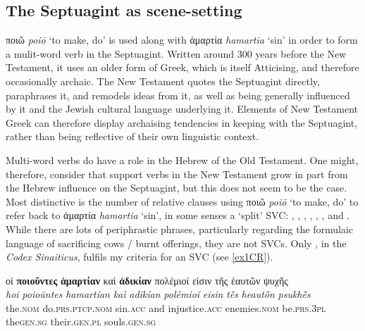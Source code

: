 \documentclass[output=paper,colorlinks,citecolor=brown]{langscibook}
\begin{document}
\subsection{The Septuagint as scene-setting}\label{the-septuagint-as-scene-settingCR}

ποιῶ \textit{poiō} ‘to make, do' is used along with ἁμαρτία \textit{hamartia} ‘sin' in order to form a mulit-word verb in the
Septuagint. 
Written around 300 years before the New Testament, it uses
an older form of Greek, which is itself Atticising, and therefore
occasionally archaic. 
The New Testament quotes the Septuagint directly,
paraphrases it, and remodels ideas from it, as well as being generally
influenced by it and the Jewish cultural language underlying it.
Elements of New Testament Greek can therefore display archaising
tendencies in keeping with the Septuagint, rather than being reflective of
their own linguistic context.

Multi-word verbs do have a role in the Hebrew of the Old Testament. 
One
might, therefore, consider that support verbs in the New Testament grow
in part from the Hebrew influence on the Septuagint, but this does not
seem to be the case. 
Most distinctive is the number of relative clauses
using ποιῶ \textit{poiō} ‘to make, do' to refer back to ἁμαρτία \textit{hamartia} ‘sin', in some senses a `split' SVC:
, , , , , , and . While there are lots of
periphrastic phrases, particularly regarding the formulaic language of
sacrificing cows / burnt offerings, they are not SVCs. Only , in the \textit{Codex Sinaiticus}, fulfils my criteria for an
SVC (see \ref{ex1CR}).


\ea\label{ex1CR}
\glll οἱ \textbf{ποιοῦντες} \textbf{ἁμαρτίαν} καὶ \textbf{ἀδικίαν} πολέμιοί εἰσιν τῆς ἑαυτῶν ψυχῆς \\
\textit{hoi}   \textit{poioũntes}  \textit{hamartían}  \textit{kaì}            \textit{adikían}    \textit{polémioí}   \textit{eisin}      \textit{tē̃s}        \textit{heautō̃n}   \textit{psukhē̃s}\\
    the.\textsc{nom} do.\textsc{prs.ptcp.nom} sin.\textsc{acc} and injustice.\textsc{acc} enemies.\textsc{nom} be.\textsc{prs.3pl} the\textsc{gen.sg} their.\textsc{gen.pl} souls.\textsc{gen.sg} \\
\end{document}

